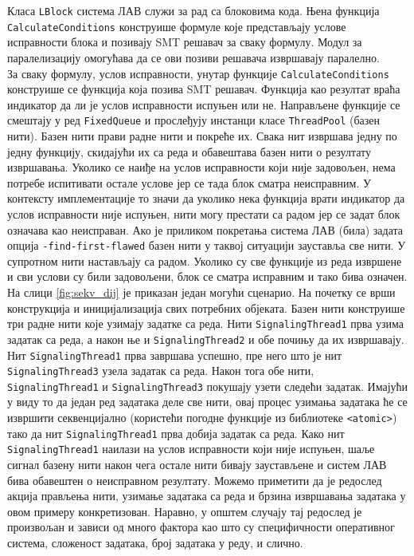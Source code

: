 \documentclass[12pt,oneside]{memoir}
\begin{document}
Класа \texttt{LBlock} система ЛАВ служи за рад са блоковима кода. Њена функција \texttt{CalculateConditions} конструише формуле које представљају услове исправности блока и позивају SMT решавач за сваку формулу. Модул за паралелизацију омогућава да се ови позиви решавача извршавају паралелно.
\\ \indent 
 За сваку формулу, услов исправности, унутар функције \texttt{CalculateConditions} конструише се функција која позива SMT решавач. Функција као резултат враћа индикатор да ли је услов исправности испуњен или не. Направљене функције се смештају у ред \texttt{FixedQueue} и прослеђују инстанци класе \texttt{ThreadPool} (базен нити). Базен нити прави радне нити и покреће их. Свака нит извршава једну по једну функцију, скидајући их са реда и обавештава базен нити о резултату извршавања. Уколико се наиђе на услов исправности који није задовољен, нема потребе испитивати остале услове јер се тада блок сматра неисправним. У контексту имплементације то значи да уколико нека функција врати индикатор да услов исправности није испуњен, нити могу престати са радом јер се задат блок означава као неисправан. Ако је приликом покретања система ЛАВ (била) задата опција \texttt{-find-first-flawed} базен нити у таквој ситуацији зауставља све нити. У супротном нити настављају са радом. Уколико су све функције из реда извршене и сви услови су били задовољени, блок се сматра исправним и тако бива означен. 
 \\ \indent
 На слици \ref{fig:sekv_dij}  је приказан један могући сценарио. На почетку се врши конструкција и иницијализација свих потребних објеката. Базен нити конструише три радне нити које узимају задатке са реда. Нити  \texttt{SignalingThread1} прва узима задатак са реда, а након ње и \texttt{SignalingThread2} и обе почињу да их извршавају. Нит \texttt{SignalingThread1} прва завршава успешно, пре него што је нит \texttt{SignalingThread3} узела задатак са реда. Након тога обе нити,  \texttt{SignalingThread1} и  \texttt{SignalingThread3} покушају узети следећи задатак. Имајући у виду то да један ред задатака деле све нити, овај процес узимања задатака ће се извршити секвенцијално (користећи погодне функције из библиотеке  \texttt{<atomic>}) тако да нит \texttt{SignalingThread1} прва добија задатак са реда. Како нит  \texttt{SignalingThread1} наилази на услов исправности који није испуњен, шаље сигнал базену нити након чега остале нити бивају заустављене и систем ЛАВ бива обавештен о неисправном резултату. Можемо приметити да је редослед акција прављења нити, узимање задатака са реда и брзина извршавања задатака у овом примеру конкретизован. Наравно, у општем случају тај редослед је произвољан и зависи од много фактора као што су специфичности оперативног система, сложеност задатака, број задатака у реду, и слично.  
\end{document}

